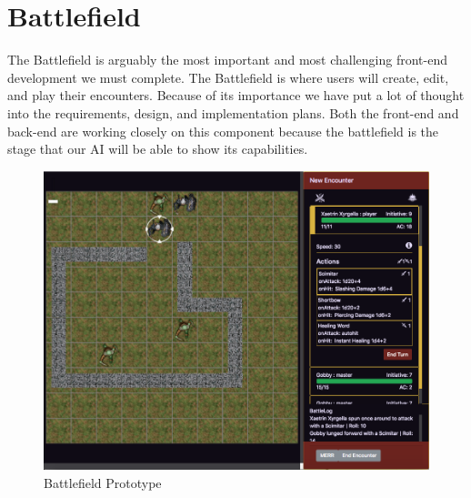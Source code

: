 \documentclass[12pt,a4paper]{report}
\begin{document}
	\section{Battlefield}
The Battlefield is arguably the most important and most challenging front-end development we must complete. The Battlefield is where users will create, edit, and play their encounters. Because of its importance we have put a lot of thought into the requirements, design, and implementation plans. Both the front-end and back-end are working closely on this component because the battlefield is the stage that our AI will be able to show its capabilities.
\begin{figure}[H]
	\centering
	\includegraphics[scale=.4]{encountercreator}
	\caption{Battlefield Prototype}
	\label{fig: Battlefield Prototype}
\end{figure}
\end{document}
